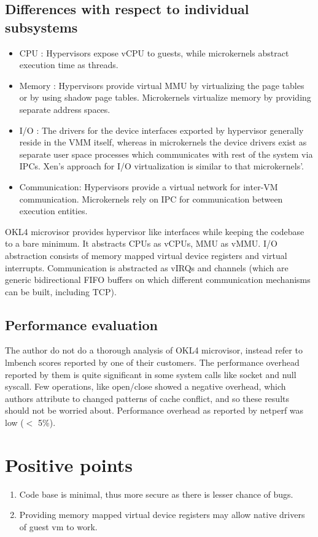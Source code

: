 \documentclass[a4paper,10pt]{article}
\begin{document}
\subsection*{Differences with respect to individual subsystems}
\begin{itemize}
 \item CPU : Hypervisors expose vCPU to guests, while microkernels abstract execution time as threads.
 \item Memory : Hypervisors provide virtual MMU by virtualizing the page tables or by using shadow page tables. Microkernels virtualize memory by providing separate address spaces.
 \item I/O : The drivers for the device interfaces exported by hypervisor generally reside in the VMM itself, whereas in microkernels the device drivers exist as separate user space processes which communicates with rest of the system via IPCs.
 Xen's approach for I/O virtualization is similar to that microkernels'.
 \item Communication: Hypervisors provide a virtual network for inter-VM communication. Microkernels rely on IPC for communication between execution entities.
\end{itemize}
OKL4 microvisor provides hypervisor like interfaces while keeping the codebase to a bare minimum.
It abstracts CPUs as vCPUs, MMU as vMMU. I/O abstraction consists of memory mapped virtual device registers and virtual interrupts.
Communication is abstracted as vIRQs and channels (which are generic bidirectional FIFO buffers on which different communication mechanisms can be built, including TCP).
\subsection*{Performance evaluation}
The author do not do a thorough analysis of OKL4 microvisor, instead refer to lmbench scores reported by one of their customers.
The performance overhead reported by them is quite significant in some system calls like socket and null syscall.
Few operations, like open/close showed a negative overhead, which authors attribute to changed patterns of cache conflict, and so these results should not be worried about.
Performance overhead as reported by netperf was low ($<$ 5\%).

\section{Positive points}
\begin{enumerate}
 \item Code base is minimal, thus more secure as there is lesser chance of bugs.
 \item Providing memory mapped virtual device registers may allow native drivers of guest vm to work.
\end{enumerate}
\end{document}
